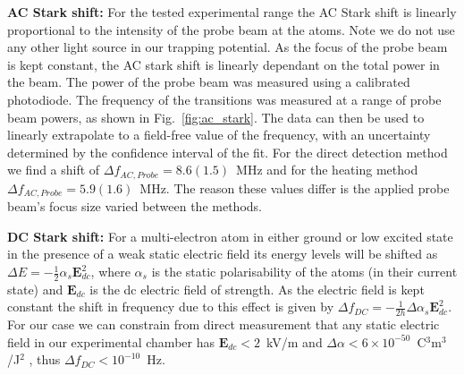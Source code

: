 \documentclass[%
 amsmath,amssymb,
aps,
]{revtex4-2}
\newcommand{\brycecom}[1]{{\color{ProcessBlue}[{#1}]\normalcolor}} %
\begin{document}
         \textbf{AC Stark shift:}
         For the tested experimental range the AC Stark shift is linearly proportional to the intensity of the probe beam at the atoms. Note we do not use any other light source in our trapping potential. As the focus of the probe beam is kept constant, the AC stark shift is linearly dependant on the total power in the beam. The power of the probe beam was measured using a calibrated photodiode. The frequency of the transitions was measured at a range of probe beam powers, as shown in Fig.~\ref{fig:ac_stark}. The data can then be used to linearly extrapolate to a field-free value of the frequency, with an uncertainty determined by the confidence interval of the fit. For the direct detection method we find a shift of \(\Delta f_{AC,Probe} = 8.6(1.5)\)~MHz and for the heating method \(\Delta f_{AC,Probe} = 5.9 (1.6)\)~MHz. The reason these values differ is the applied probe beam's focus size varied between the methods.
         
         \textbf{DC Stark shift:} For a multi-electron atom in either ground or low excited state in the presence of a weak static electric field its energy levels will be shifted as \(\Delta E = -\frac{1}{2} \alpha_s \mathbf{E}_{dc}^2\), where \(\alpha_s\) is the static polarisability of the atoms (in their current state) and \(\mathbf{E}_{dc}\) is the dc electric field of strength. As the electric field is kept constant the shift in frequency due to this effect is given by \(\Delta f_{DC} = -\frac{1}{2h} \Delta \alpha_s \mathbf{E}_{dc}^2\). For our case we can constrain from direct measurement that any static electric field in our experimental chamber has \(\mathbf{E}_{dc}<2\)~kV/m and \(\Delta \alpha < 6\times 10^{-50}\)~C\(^3\)m\(^3\)/J\(^2\) \cite{Kondratjev2010}, thus \(\Delta f_{DC}<10^{-10}\)~Hz. \\
         
\end{document}
